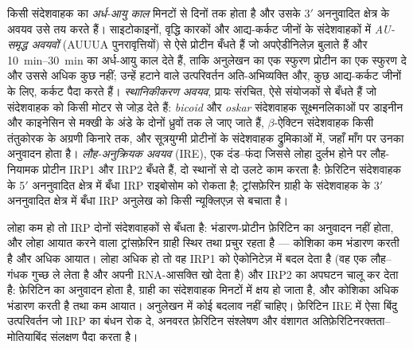 \begin{definition}\label{def:b3:rna-regulation:stability}
किसी संदेशवाहक का \emph{अर्ध-आयु काल} मिनटों से दिनों तक होता है और
उसके 3$'$ अननुवादित क्षेत्र के अवयव उसे तय करते हैं। साइटोकाइनों,
वृद्धि कारकों और आद्य-कर्कट जीनों के संदेशवाहकों में
\emph{AU-समृद्ध अवयवों} (AUUUA पुनरावृत्तियों) से ऐसे प्रोटीन बँधते हैं
जो अपऐडीनिलेज़ बुलाते हैं और \qtyrange{10}{30}{min} का अर्ध-आयु काल
देते हैं, ताकि अनुलेखन का एक स्फुरण प्रोटीन का एक स्फुरण दे और उससे
अधिक कुछ नहीं; उन्हें हटाने वाले उत्परिवर्तन अति-अभिव्यक्ति और, कुछ
आद्य-कर्कट जीनों के लिए, कर्कट पैदा करते हैं। \emph{स्थानिकीकरण अवयव},
प्रायः संरचित, ऐसे संयोजकों से बँधते हैं जो संदेशवाहक को किसी मोटर से
जोड़ देते हैं: \emph{bicoid} और \emph{oskar} संदेशवाहक सूक्ष्मनलिकाओं
पर डाइनीन और काइनेसिन से मक्खी के अंडे के दोनों ध्रुवों तक ले जाए जाते
हैं, $\beta$-ऐक्टिन संदेशवाहक किसी तंतुकोरक के अग्रणी किनारे तक, और
सूत्रयुग्मी प्रोटीनों के संदेशवाहक द्रुमिकाओं में, जहाँ माँग पर उनका
अनुवादन होता है। \emph{लौह-अनुक्रियक अवयव} (IRE), एक दंड--फंदा जिससे
लोहा दुर्लभ होने पर लौह-नियामक प्रोटीन IRP1 और IRP2 बँधते हैं, दो
स्थानों से दो उलटे काम करता है: फ़ेरिटिन संदेशवाहक के 5$'$ अननुवादित
क्षेत्र में बँधा IRP राइबोसोम को रोकता है; ट्रांसफ़ेरिन ग्राही के
संदेशवाहक के 3$'$ अननुवादित क्षेत्र में बँधा IRP अनुलेख को किसी
न्यूक्लिएज़ से बचाता है।
\end{definition}

\begin{example}[लोहा, एक ही हेयरपिन से पढ़ा गया]\label{ex:b3:rna-regulation:iron}
लोहा कम हो तो IRP दोनों संदेशवाहकों से बँधता है: भंडारण-प्रोटीन
फ़ेरिटिन का अनुवादन नहीं होता, और लोहा आयात करने वाला ट्रांसफ़ेरिन
ग्राही स्थिर तथा प्रचुर रहता है --- कोशिका कम भंडारण करती है और अधिक
आयात। लोहा अधिक हो तो वह IRP1 को ऐकोनिटेज़ में बदल देता है (वह एक
लौह--गंधक गुच्छ ले लेता है और अपनी RNA-आसक्ति खो देता है) और IRP2 का
अपघटन चालू कर देता है: फ़ेरिटिन का अनुवादन होता है, ग्राही का संदेशवाहक
मिनटों में क्षय हो जाता है, और कोशिका अधिक भंडारण करती है तथा कम आयात।
अनुलेखन में कोई बदलाव नहीं चाहिए। फ़ेरिटिन IRE में ऐसा बिंदु
उत्परिवर्तन जो IRP का बंधन रोक दे, अनवरत फ़ेरिटिन संश्लेषण और वंशागत
अतिफ़ेरिटिनरक्तता--मोतियाबिंद संलक्षण पैदा करता है।
\end{example}

